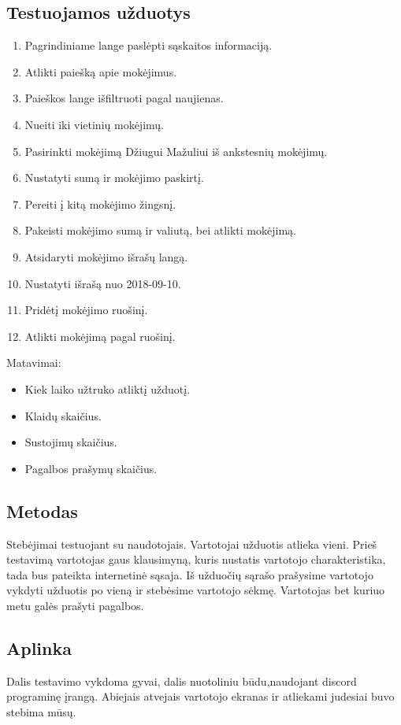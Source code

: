 \documentclass[oneside]{VUMIFPSkursinis}
\begin{document}
\subsection{Testuojamos užduotys}
\begin{enumerate}
	\item Pagrindiniame lange paslėpti sąskaitos informaciją.
	\item Atlikti paiešką apie mokėjimus.
	\item Paieškos lange išfiltruoti pagal naujienas.
	\item Nueiti iki vietinių mokėjimų.
	\item Pasirinkti mokėjimą Džiugui Mažuliui iš ankstesnių mokėjimų.
	\item Nustatyti sumą ir mokėjimo paskirtį.
	\item Pereiti į kitą mokėjimo žingsnį.
	\item Pakeisti mokėjimo sumą ir valiutą, bei atlikti mokėjimą.
	\item Atsidaryti mokėjimo išrašų langą.
	\item Nustatyti išrašą nuo 2018-09-10.
	\item Pridėtį mokėjimo ruošinį.
	\item Atlikti mokėjimą pagal ruošinį.
\end{enumerate}
Matavimai:
\begin{itemize}
	\item Kiek laiko užtruko atliktį užduotį.
	\item Klaidų skaičius.
	\item Sustojimų skaičius.
	\item Pagalbos prašymų skaičius.
\end{itemize}
\subsection{Metodas}
Stebėjimai testuojant su naudotojais. Vartotojai užduotis atlieka vieni. Prieš testavimą vartotojas gaus klausimyną, kuris nustatis vartotojo charakteristika, tada bus pateikta internetinė sąsaja. Iš užduočių sąrašo prašysime vartotojo vykdyti užduotis po vieną ir stebėsime vartotojo sėkmę. Vartotojas bet kuriuo metu galės prašyti pagalbos. 
\subsection{Aplinka}
Dalis testavimo vykdoma gyvai, dalis nuotoliniu būdu,naudojant discord programinę įrangą. Abiejais atvejais vartotojo ekranas ir atliekami judesiai buvo stebima mūsų.
\end{document}
